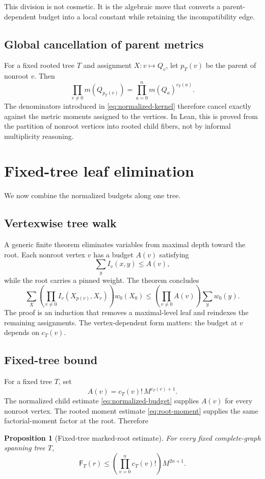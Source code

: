 \documentclass[11pt]{article}
\newtheorem{proposition}[theorem]{Proposition}
\begin{document}
This division is not cosmetic.  It is the algebraic move that converts a parent-dependent budget into a local constant while retaining the incompatibility edge.

\subsection{Global cancellation of parent metrics}

For a fixed rooted tree $T$ and assignment $X:v\mapsto Q_v$, let $p_T(v)$ be the parent of nonroot $v$.  Then
\begin{equation}\label{eq:parent-product}
  \prod_{v\ne0}m(Q_{p_T(v)})
  =\prod_{a=0}^{n}m(Q_a)^{c_T(a)}.
\end{equation}
The denominators introduced in \cref{eq:normalized-kernel} therefore cancel exactly against the metric moments assigned to the vertices.  In Lean, this is proved from the partition of nonroot vertices into rooted child fibers, not by informal multiplicity reasoning.

\section{Fixed-tree leaf elimination}

We now combine the normalized budgets along one tree.

\subsection{Vertexwise tree walk}

A generic finite theorem eliminates variables from maximal depth toward the root.  Each nonroot vertex $v$ has a budget $A(v)$ satisfying
\[
  \sum_y I_v(x,y)\le A(v),
\]
while the root carries a pinned weight.  The theorem concludes
\begin{equation}\label{eq:vertex-walk}
  \sum_X
  \left(\prod_{v\ne0}I_v(X_{p(v)},X_v)\right)
  w_0(X_0)
  \le
  \left(\prod_{v\ne0}A(v)\right)
  \sum_y w_0(y).
\end{equation}
The proof is an induction that removes a maximal-level leaf and reindexes the remaining assignments.  The vertex-dependent form matters: the budget at $v$ depends on $c_T(v)$.

\subsection{Fixed-tree bound}

For a fixed tree $T$, set
\[
  A(v)=c_T(v)!\,M^{c_T(v)+1}.
\]
The normalized child estimate \cref{eq:normalized-budget} supplies $A(v)$ for every nonroot vertex.  The rooted moment estimate \cref{eq:root-moment} supplies the same factorial-moment factor at the root.  Therefore
\begin{proposition}[Fixed-tree marked-root estimate]\label{prop:fixed-tree}
For every fixed complete-graph spanning tree $T$,
\begin{equation}\label{eq:fixed-tree}
  \mathsf F_T(r)
  \le
  \left(\prod_{v=0}^{n}c_T(v)!\right)
  M^{2n+1}.
\end{equation}
\end{proposition}
\end{document}
